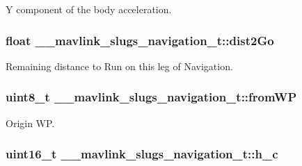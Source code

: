 Y component of the body acceleration. 

\hypertarget{struct____mavlink__slugs__navigation__t_a86b9f19b0ba5008f6ccab9490f2c3c8e}{
\subsubsection[{dist2\+Go}]{\setlength{\rightskip}{0pt plus 5cm}float \+\_\+\+\_\+mavlink\+\_\+slugs\+\_\+navigation\+\_\+t\+::dist2\+Go}}\label{struct____mavlink__slugs__navigation__t_a86b9f19b0ba5008f6ccab9490f2c3c8e}


Remaining distance to Run on this leg of Navigation. 

\hypertarget{struct____mavlink__slugs__navigation__t_ae52976fa7c429993164d1392ed9956a2}{
\subsubsection[{from\+W\+P}]{\setlength{\rightskip}{0pt plus 5cm}uint8\+\_\+t \+\_\+\+\_\+mavlink\+\_\+slugs\+\_\+navigation\+\_\+t\+::from\+W\+P}}\label{struct____mavlink__slugs__navigation__t_ae52976fa7c429993164d1392ed9956a2}


Origin W\+P. 

\hypertarget{struct____mavlink__slugs__navigation__t_a3277ba90234007d18d1b793fa72d20a3}{
\subsubsection[{h\+\_\+c}]{\setlength{\rightskip}{0pt plus 5cm}uint16\+\_\+t \+\_\+\+\_\+mavlink\+\_\+slugs\+\_\+navigation\+\_\+t\+::h\+\_\+c}}\label{struct____mavlink__slugs__navigation__t_a3277ba90234007d18d1b793fa72d20a3}



